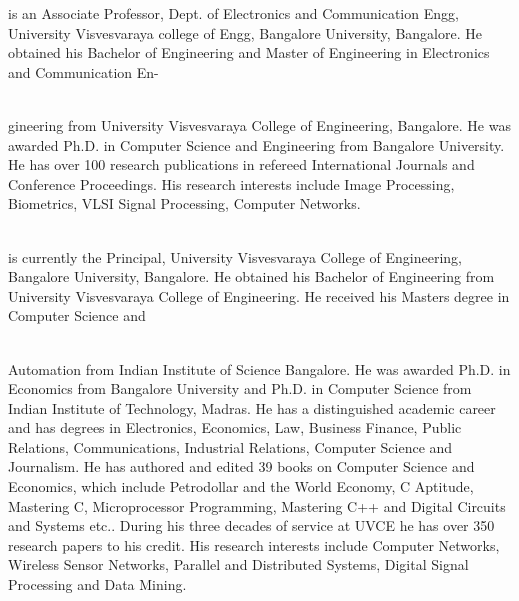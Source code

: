 \documentclass[fleqn,twoside]{article}
\begin{document}
\begin{minipage}[b][1in][c]{1.8in}
{ is an Associate Professor, Dept. of Electronics and Communication Engg, University Visvesvaraya college of Engg, Bangalore University, Bangalore. He     obtained his Bachelor of Engineering and Master of Engineering in Electronics and Communication  En- }\\\\
\end{minipage}
gineering from University   Visvesvaraya  College     of Engineering, Bangalore. He was awarded
Ph.D. in Computer Science and Engineering from Bangalore
University. He has over 100 research publications in refereed
International Journals and Conference Proceedings. His research
interests include Image Processing, Biometrics, VLSI      Signal
Processing, Computer Networks.
 \\\\
\begin{minipage}[b][1in][c]{1.8in}
{ is currently the Principal, University Visvesvaraya College of Engineering, Bangalore University, Bangalore. He obtained his Bachelor of Engineering from University Visvesvaraya College of Engineering. He received his Masters degree in Computer Science and} \\ \\
\end{minipage}
Automation from Indian Institute of Science Bangalore. He was awarded Ph.D. in Economics from Bangalore University and Ph.D. in Computer Science from Indian Institute of Technology, Madras. He has a distinguished academic career and has degrees in Electronics, Economics, Law, Business Finance, Public Relations, Communications, Industrial Relations, Computer Science and Journalism. He has authored and edited 39 books on Computer Science and Economics, which include Petrodollar and the World Economy, C Aptitude, Mastering C, Microprocessor Programming, Mastering C++ and Digital Circuits and Systems etc.. During his three decades of service at UVCE he has over 350 research papers to his credit. His research interests include Computer Networks, Wireless Sensor Networks, Parallel and Distributed Systems, Digital Signal Processing and Data Mining.\\ \\
\end{document}
